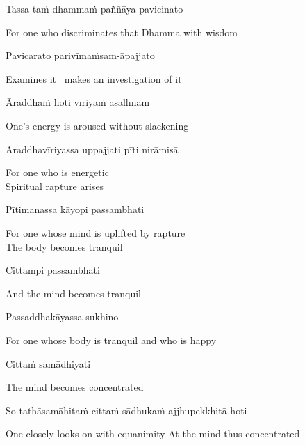 Tassa taṁ dhammaṁ paññāya pavicinato

\begin{english}
  For one who discriminates that Dhamma with wisdom
\end{english}

Pavicarato parivīmaṁsam-āpajjato

\begin{english}
  Examines it \breathmark\ makes an investigation of it
\end{english}

Āraddhaṁ hoti vīriyaṁ asallīnaṁ

\begin{english}
  One’s energy is aroused without slackening
\end{english}

Āraddhavīriyassa uppajjati pīti nirāmisā

\begin{english}
  For one who is energetic\\
  Spiritual rapture arises
\end{english}

Pītimanassa kāyopi passambhati

\begin{english}
  For one whose mind is uplifted by rapture\\
  The body becomes tranquil
\end{english}

Cittampi passambhati

\begin{english}
  And the mind becomes tranquil
\end{english}

Passaddhakāyassa sukhino

\begin{english}
  For one whose body is tranquil and who is happy
\end{english}

Cittaṁ samādhiyati

\begin{english}
  The mind becomes concentrated
\end{english}

So tathāsamāhitaṁ cittaṁ sādhukaṁ ajjhupekkhitā hoti

\begin{english}
  One closely looks on with equanimity
  At the mind thus concentrated
\end{english}

\suttaRef{[SN 46.3]}

